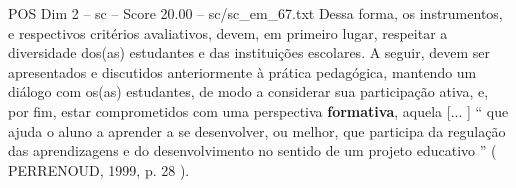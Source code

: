 \begin{textsample}{POS Dim 2 – sc – Score 20.00 – sc/sc\_em\_67.txt}
Dessa forma, os instrumentos, e respectivos critérios avaliativos, devem, em primeiro lugar, respeitar a diversidade dos(as) estudantes e das instituições escolares.
A seguir, devem ser apresentados e discutidos anteriormente à prática pedagógica, mantendo um diálogo com os(as) estudantes, de modo a considerar sua participação ativa, e, por fim, estar comprometidos com uma perspectiva \textbf{formativa}, aquela [... ] “ que ajuda o aluno a aprender a se desenvolver, ou melhor, que participa da regulação das aprendizagens e do desenvolvimento no sentido de um projeto educativo ” ( PERRENOUD, 1999, p. 28 ).

\end{textsample}
